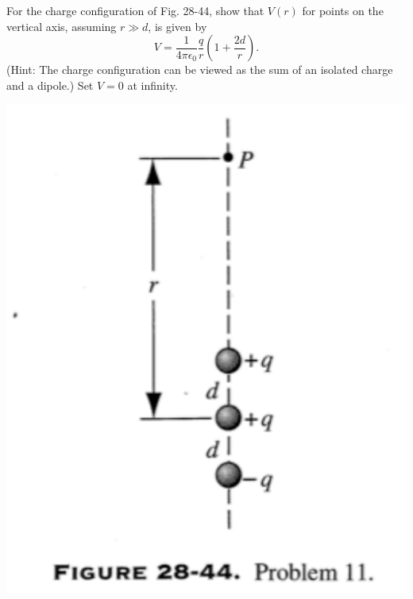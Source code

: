 \documentclass[12pt,letterpaper,boxed,cm]{hmcpset}
\newcommand{\f}[2]{\frac{#1}{#2}}
\newcommand{\pn}[1]{\left( #1 \right)}
\renewcommand{\k}[0]{\f{1}{4\pi\epsilon_0}}
\begin{document}
\begin{problem}[28-P11]
For the charge configuration of Fig. 28-44, show that $V(r)$ for points on the vertical axis, assuming $r \gg d$, is given by
\begin{equation*}
	V = \k \f{q}{r} \pn{1 + \f{2d}{r}}.
\end{equation*}
(Hint: The charge configuration can be viewed as the sum of an isolated charge and a dipole.) Set $V = 0$ at infinity.
\begin{center}
	\includegraphics[scale=0.7]{02.png}	
\end{center}
\end{problem}
\begin{solution}	
\end{solution}
\newpage
\end{document}
